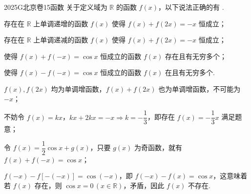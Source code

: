 
\begin{problem}{2025}{G}{北京卷}{15}{函数}
关于定义域为 $\mathbb{R}$ 的函数 $f(x)$，以下说法正确的有 \underline{\hspace{4em}}.

 存在在 $\mathbb{R}$ 上单调递增的函数 $f(x)$ 使得 $f(x)+f(2x)=-x$ 恒成立；

 存在在 $\mathbb{R}$ 上单调递减的函数 $f(x)$ 使得 $f(x)+f(2x)=-x$ 恒成立；

 使得 $f(x)+f(-x)=\cos x$ 恒成立的函数 $f(x)$ 存在且有无穷多个；

 使得 $f(x)-f(-x)=\cos x$ 恒成立的函数 $f(x)$ 在且有无穷多个.
\end{problem}

\begin{answer}
\end{answer}

\begin{solutions}
 $f(x),f(2x)$ 均为单调增函数，$f(x)+f(2x)$ 也为单调增函数，不可能为 $-x$；

 不妨令 $f(x)=kx$，$kx+2kx=-x\Rightarrow k=-\dfrac{1}{3}$，即存在 $f(x)=-\dfrac{1}{3}x$ 满足题意；

 令 $f(x)=\dfrac{1}{2}\cos x+g(x)$，只要 $g(x)$ 为奇函数，就有 $f(x)+f(-x)=\cos x$；

 $f(-x)-f[-(-x)]=\cos(-x)$，即 $f(-x)-f(x)=\cos x$，这意味着若 $f(x)$ 存在，则 $\cos x=0\,(x\in\mathbb{R})$，矛盾，因此 $f(x)$ 不存在.
\end{solutions}